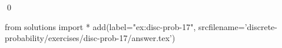 
\begin{ex} 
  \label{ex:disc-prob-17}
  
  \qed
\end{ex} 
\begin{python0}
from solutions import *
add(label="ex:disc-prob-17",
    srcfilename='discrete-probability/exercises/disc-prob-17/answer.tex') 
\end{python0}

